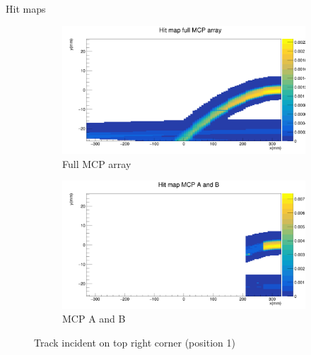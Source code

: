 \documentclass{beamer}
\begin{document}
\begin{frame}{Hit maps}
  \begin{figure}
    \centering
    \vspace{-0.2cm}
    \begin{subfigure}{0.5\textwidth}
      \includegraphics[width = 1.0\textwidth]{Plots/HitMapMCPFull.png}
      \caption{Full MCP array}
    \end{subfigure}%
    \begin{subfigure}{0.5\textwidth}
      \includegraphics[width = 1.0\textwidth]{Plots/HitMapMCPAB.png}
      \caption{MCP A and B}
    \end{subfigure}
    \caption{Track incident on top right corner (position 1)}
  \end{figure}
\end{frame}
\end{document}
